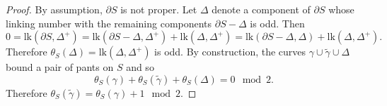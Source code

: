 \documentclass[10pt,a4paper]{amsart}
\begin{document}
\begin{proof}
By assumption, $\partial S$ is not proper. Let $\Delta$ denote a component of $\partial S$ whose linking number with the remaining components $\partial S -\Delta$ is odd. Then 
\[ 0 = \mathrm{lk}(\partial S,\Delta^+) = \mathrm{lk}(\partial S-\Delta,\Delta^+) + \mathrm{lk}(\Delta,\Delta^+) = \mathrm{lk}(\partial S-\Delta,\Delta) + \mathrm{lk}(\Delta,\Delta^+).\]
Therefore $\theta_S(\Delta) = \mathrm{lk}(\Delta,\Delta^+)$ is odd. By construction, the curves $\gamma \cup \widetilde{\gamma} \cup \Delta$ bound a pair of pants on $S$ and so 
\[ \theta_S(\gamma) + \theta_S(\widetilde{\gamma}) + \theta_S(\Delta) = 0 \mod 2.\]
Therefore $\theta_{S}(\widetilde{\gamma}) = \theta_S(\gamma) +1 \mod 2.$
\end{proof}
\end{document}
